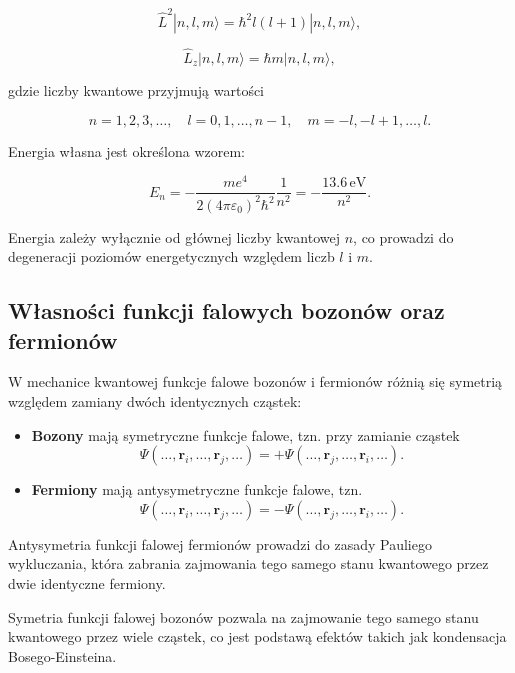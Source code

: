 \[
\hat{L}^2 |n, l, m\rangle = \hbar^2 l(l+1) |n, l, m\rangle,
\]

\[
\hat{L}_z |n, l, m\rangle = \hbar m |n, l, m\rangle,
\]

gdzie liczby kwantowe przyjmują wartości

\[
n = 1, 2, 3, \ldots, \quad l = 0, 1, \ldots, n-1, \quad m = -l, -l+1, \ldots, l.
\]

Energia własna jest określona wzorem:

\[
E_n = - \frac{m e^4}{2 (4 \pi \varepsilon_0)^2 \hbar^2} \frac{1}{n^2} = - \frac{13.6\,\mathrm{eV}}{n^2}.
\]

Energia zależy wyłącznie od głównej liczby kwantowej \(n\), co prowadzi do degeneracji poziomów energetycznych względem liczb \(l\) i \(m\).

\subsection{Własności funkcji falowych bozonów oraz fermionów}


W mechanice kwantowej funkcje falowe bozonów i fermionów różnią się symetrią względem zamiany dwóch identycznych cząstek:

\begin{itemize}
    \item \textbf{Bozony} mają symetryczne funkcje falowe, tzn. przy zamianie cząstek
    \[
    \Psi(\ldots, \mathbf{r}_i, \ldots, \mathbf{r}_j, \ldots) = + \Psi(\ldots, \mathbf{r}_j, \ldots, \mathbf{r}_i, \ldots).
    \]
    
    \item \textbf{Fermiony} mają antysymetryczne funkcje falowe, tzn.
    \[
    \Psi(\ldots, \mathbf{r}_i, \ldots, \mathbf{r}_j, \ldots) = - \Psi(\ldots, \mathbf{r}_j, \ldots, \mathbf{r}_i, \ldots).
    \]
\end{itemize}

Antysymetria funkcji falowej fermionów prowadzi do zasady Pauliego wykluczania, która zabrania zajmowania tego samego stanu kwantowego przez dwie identyczne fermiony.

Symetria funkcji falowej bozonów pozwala na zajmowanie tego samego stanu kwantowego przez wiele cząstek, co jest podstawą efektów takich jak kondensacja Bosego-Einsteina.
